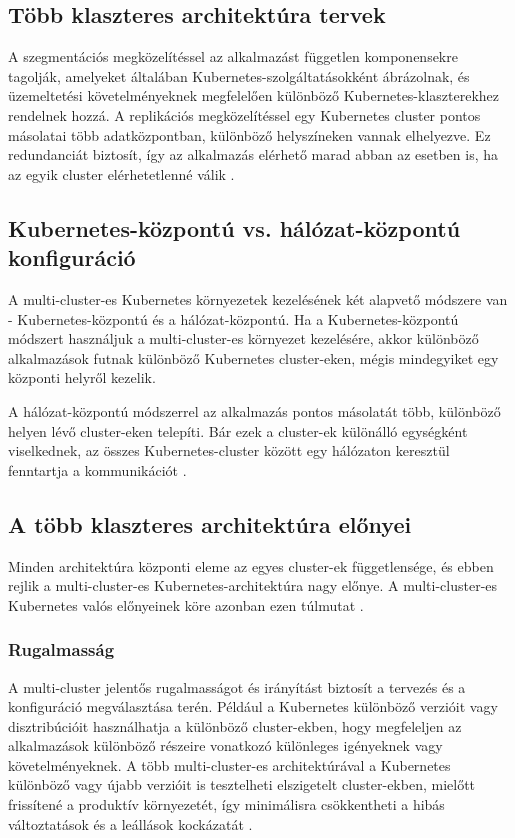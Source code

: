 \subsection{Több klaszteres architektúra tervek}
A szegmentációs megközelítéssel az alkalmazást független komponensekre tagolják, amelyeket általában Kubernetes-szolgáltatásokként ábrázolnak, és üzemeltetési követelményeknek megfelelően különböző Kubernetes-klaszterekhez rendelnek hozzá.
A replikációs megközelítéssel egy Kubernetes cluster pontos másolatai több adatközpontban, különböző helyszíneken vannak elhelyezve.
Ez redundanciát biztosít, így az alkalmazás elérhető marad abban az esetben is, ha az egyik cluster elérhetetlenné válik \cite{multicluster}.

\subsection{Kubernetes-központú vs. hálózat-központú konfiguráció}
A multi-cluster-es Kubernetes környezetek kezelésének két alapvető módszere van - Kubernetes-központú és a hálózat-központú.
Ha a Kubernetes-központú módszert használjuk a multi-cluster-es környezet kezelésére, akkor különböző alkalmazások futnak különböző Kubernetes cluster-eken, mégis mindegyiket egy központi helyről kezelik.

A hálózat-központú módszerrel az alkalmazás pontos másolatát több, különböző helyen lévő cluster-eken telepíti.
Bár ezek a cluster-ek különálló egységként viselkednek, az összes Kubernetes-cluster között egy hálózaton keresztül fenntartja a kommunikációt \cite{multicluster}.

\subsection{A több klaszteres architektúra előnyei}
Minden architektúra központi eleme az egyes cluster-ek függetlensége, és ebben rejlik a multi-cluster-es Kubernetes-architektúra nagy előnye.
A multi-cluster-es Kubernetes valós előnyeinek köre azonban ezen túlmutat \cite{multicluster}.

\subsubsection*{Rugalmasság}
A multi-cluster jelentős rugalmasságot és irányítást biztosít a tervezés és a konfiguráció megválasztása terén.
Például a Kubernetes különböző verzióit vagy disztribúcióit használhatja a különböző cluster-ekben, hogy megfeleljen az alkalmazások különböző részeire vonatkozó különleges igényeknek vagy követelményeknek.
A több multi-cluster-es architektúrával a Kubernetes különböző vagy újabb verzióit is tesztelheti elszigetelt cluster-ekben, mielőtt frissítené a produktív környezetét, így minimálisra csökkentheti a hibás változtatások és a leállások kockázatát \cite{multicluster}.

